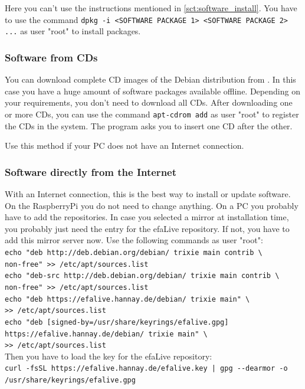 \documentclass[a4paper,12pt,twoside]{article}
\begin{document}
Here you can't use the instructions mentioned in \ref{sct:software_install}.
You have to use the command \texttt{dpkg -i {\textless}SOFTWARE
PACKAGE 1{\textgreater} {\textless}SOFTWARE PACKAGE 2{\textgreater}
...} as user "root" to install packages.


\subsubsection{Software from CDs}
\label{sct:software_cd}
You can download complete CD images of the Debian distribution from
\cite{DEB4}. In this case you have a huge amount of software packages
available offline. Depending on your requirements, you
don't need to download all CDs. After downloading one
or more CDs, you can use the command \texttt{apt-cdrom
add} as user "root" to
register the CDs in the system. The program asks you to insert one CD
after the other.

Use this method if your PC does not have an Internet connection.


\subsubsection{Software directly from the Internet}
\label{sct:software_internet}
With an Internet connection, this is the best way to install or update
software. On the RaspberryPi you do not need to change anything. On a PC you 
probably have to add the repositories. In case you 
selected a mirror at installation time, you probably just
need the entry for the efaLive repository. If not, you have to add this mirror 
server now. Use the following commands as user "root":
\bigskip
\\
\texttt{echo "deb http://deb.debian.org/debian/ trixie main contrib \textbackslash\\
    non-free"\ {\textgreater}{\textgreater} /etc/apt/sources.list}
\\
\texttt{echo "deb-src http://deb.debian.org/debian/ trixie main contrib \textbackslash\\
    non-free"\ {\textgreater}{\textgreater} /etc/apt/sources.list}
\\
\texttt{echo "deb https://efalive.hannay.de/debian/ trixie main" \textbackslash\\
    {\textgreater}{\textgreater} /etc/apt/sources.list}
\\
\texttt{echo "deb [signed-by=/usr/share/keyrings/efalive.gpg] https://efalive.hannay.de/debian/ trixie main" \textbackslash\\
    {\textgreater}{\textgreater} /etc/apt/sources.list}
\bigskip
\\
Then you have to load the key for the efaLive repository:
\bigskip
\\
\texttt{curl -fsSL https://efalive.hannay.de/efalive.key | gpg -{}-dearmor -o /usr/share/keyrings/efalive.gpg}
\end{document}
